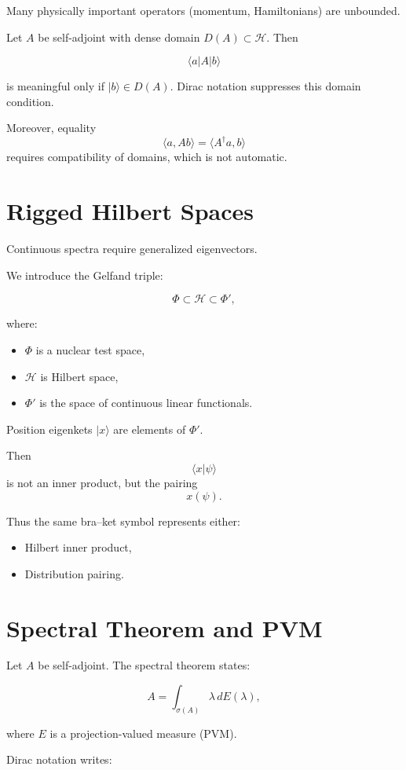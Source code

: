\documentclass[12pt]{article}
\begin{document}
Many physically important operators (momentum, Hamiltonians)
are unbounded.

Let $A$ be self-adjoint with dense domain $D(A)\subset \mathcal H$.
Then

\[
\langle a|A|b\rangle
\]

is meaningful only if $|b\rangle \in D(A)$.
Dirac notation suppresses this domain condition.

Moreover, equality
\[
\langle a, Ab\rangle = \langle A^\dagger a, b\rangle
\]
requires compatibility of domains, which is not automatic.

\section{Rigged Hilbert Spaces}

Continuous spectra require generalized eigenvectors.

We introduce the Gelfand triple:

\[
\Phi \subset \mathcal H \subset \Phi',
\]

where:
\begin{itemize}
\item $\Phi$ is a nuclear test space,
\item $\mathcal H$ is Hilbert space,
\item $\Phi'$ is the space of continuous linear functionals.
\end{itemize}

Position eigenkets $|x\rangle$ are elements of $\Phi'$.

Then
\[
\langle x|\psi\rangle
\]
is not an inner product, but the pairing
\[
x(\psi).
\]

Thus the same bra--ket symbol represents either:
\begin{itemize}
\item Hilbert inner product,
\item Distribution pairing.
\end{itemize}

\section{Spectral Theorem and PVM}

Let $A$ be self-adjoint.
The spectral theorem states:

\[
A = \int_{\sigma(A)} \lambda\, dE(\lambda),
\]

where $E$ is a projection-valued measure (PVM).

Dirac notation writes:
\end{document}
